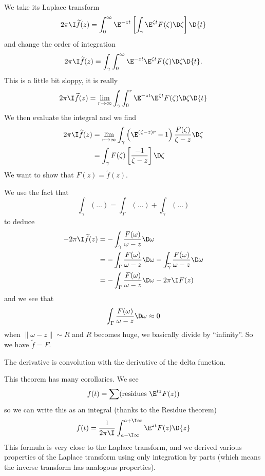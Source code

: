 We take its Laplace transform
\begin{equation}
2\pi\I\widetilde{f}(z)=\int^{\infty}_{0}\E^{-zt}\left[\int_{\gamma}\E^{\zeta t}F(\zeta)\D\zeta\right]\D{t}
\end{equation}
and change the order of integration
\begin{equation*}
2\pi\I\widetilde{f}(z)=\int_{\gamma}\int^{\infty}_{0}\E^{-zt}\E^{\zeta t}F(\zeta)\D\zeta\D{t}.
\end{equation*}
This is a little bit sloppy, it is really
\begin{equation}
2\pi\I\widetilde{f}(z)=\lim_{r\to\infty}\int_{\gamma}\int^{r}_{0}\E^{-zt}\E^{\zeta t}F(\zeta)\D\zeta\D{t}
\end{equation}
We then evaluate the integral and we find
\begin{equation}
\begin{split}
2\pi\I\widetilde{f}(z)&=\lim_{r\to\infty}\int_{\gamma}\left(\E^{(\zeta-z)r}-1\right)\frac{F(\zeta)}{\zeta-z}\D\zeta\\
&=\int_{\gamma}F(\zeta)\left[\frac{-1}{\zeta-z}\right]\D\zeta
\end{split}
\end{equation}
We want to show that $F(z)=\widetilde{f}(z)$. 

We use the fact that
\begin{equation}
\int_{\gamma}(\dots)=\int_{\Gamma}(\dots)+\int_{\widetilde{\gamma}}(\dots)
\end{equation}
to deduce
\begin{subequations}
\begin{align}
-2\pi\I\widetilde{f}(z)
&=-\int_{\gamma}\frac{F(\omega)}{\omega-z}\D\omega\\
&=-\int_{\Gamma}\frac{F(\omega)}{\omega-z}\D\omega-\int_{\widetilde{\gamma}}\frac{F(\omega)}{\omega-z}\D\omega\\
&=-\int_{\Gamma}\frac{F(\omega)}{\omega-z}\D\omega-2\pi\I F(z)
\end{align}
\end{subequations}
and we see that
\begin{equation}
\int_{\Gamma}\frac{F(\omega)}{\omega-z}\D\omega\approx 0
\end{equation}
when $\|\omega-z\|\sim R$ and $R$ becomes huge, we basically
divide by ``infinity''. So we have $\widetilde{f}=F$.

\begin{rmk}
The derivative is convolution with the derivative of the delta
function. 
\end{rmk}


This theorem has many corollaries. We see
\begin{equation}
f(t)=\sum(\mbox{residues }\E^{tz}F(z))
\end{equation}
so we can write this as an integral (thanks to the Residue
theorem)
\begin{equation}
f(t)=\frac{1}{2\pi\I}\int^{a+\I\infty}_{a-\I\infty}\E^{zt}F(z)\D{z}
\end{equation}
This formula is very close to the Laplace transform, and we
derived various properties of the Laplace transform using only
integration by parts (which means the inverse transform has
analogous properties).
